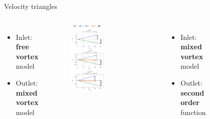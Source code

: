 	{\nologo
	\begin{frame}{Velocity triangles}
		\begin{columns}
				\begin{itemize}	
					\item Inlet: \textbf{free vortex} model
					\item Outlet: \textbf{mixed vortex} model
				\end{itemize}
				\begin{figure}
					\centering
					\includegraphics[width=0.5\textwidth]{figures/rotorVelocityTriangle.pdf}
				\end{figure}
				\begin{itemize}	
					\item Inlet: \textbf{mixed vortex} model
					\item Outlet: \textbf{second order} function 
				\end{itemize}
				\begin{figure}
					\centering

\end{figure}
\end{columns}
\end{frame}}

